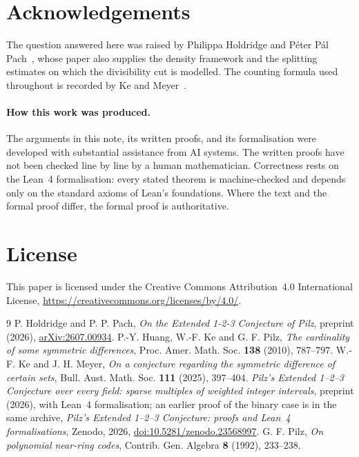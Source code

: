 \documentclass[11pt]{article}
\begin{document}
\section*{Acknowledgements}
The question answered here was raised by Philippa Holdridge and
P\'eter P\'al Pach~\cite[Remark 1.9]{HP}, whose paper also supplies the
density framework and the splitting estimates on which the divisibility
cut is modelled. The counting formula used throughout is recorded by Ke
and Meyer~\cite[(2.1)]{KM}.

\paragraph{How this work was produced.}
The arguments in this note, its written proofs, and its formalisation were
developed with substantial assistance from AI systems. The written proofs
have not been checked line by line by a human mathematician. Correctness
rests on the Lean~4 formalisation: every stated theorem is machine-checked
and depends only on the standard axioms of Lean's foundations. Where the
text and the formal proof differ, the formal proof is authoritative.

\section*{License}
This paper is licensed under the Creative Commons Attribution~4.0
International License, \url{https://creativecommons.org/licenses/by/4.0/}.

\begin{thebibliography}{9}
P. Holdridge and P. P. Pach,
\emph{On the Extended 1-2-3 Conjecture of Pilz},
preprint (2026), \href{https://arxiv.org/abs/2607.00934}{arXiv:2607.00934}.
P.-Y. Huang, W.-F. Ke and G. F. Pilz,
\emph{The cardinality of some symmetric differences},
Proc. Amer. Math. Soc. \textbf{138} (2010), 787--797.
W.-F. Ke and J. H. Meyer,
\emph{On a conjecture regarding the symmetric difference of certain sets},
Bull. Aust. Math. Soc. \textbf{111} (2025), 397--404.
\emph{Pilz's Extended 1--2--3 Conjecture over every field: sparse
multiples of weighted integer intervals}, preprint (2026), with Lean~4
formalisation; an earlier proof of the binary case is in the same archive,
\emph{Pilz's Extended 1--2--3 Conjecture: proofs and Lean~4
formalisations}, Zenodo, 2026,
\href{https://doi.org/10.5281/zenodo.23568997}{doi:10.5281/zenodo.23568997}.
G. F. Pilz,
\emph{On polynomial near-ring codes},
Contrib. Gen. Algebra \textbf{8} (1992), 233--238.
\end{thebibliography}
\end{document}
